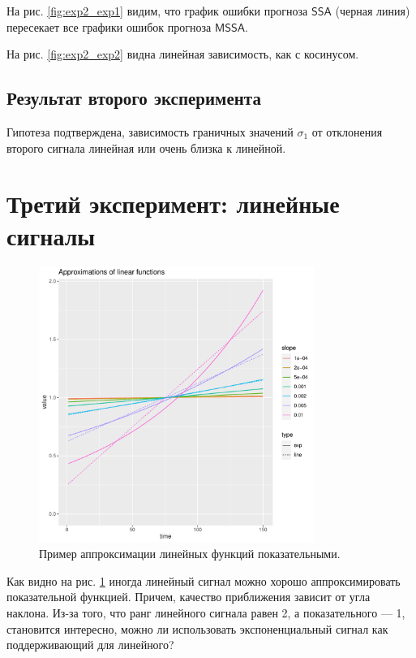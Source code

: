 \documentclass[specialist, substylefile = spbureport.rtx,
    subf,href,colorlinks=true, 12pt]{disser}
\newcommand{\SSA}{\mathsf{SSA}}
\newcommand{\MSSA}{\mathsf{MSSA}}
\begin{document}
        На рис. \ref{fig:exp2_exp1} видим, что график ошибки прогноза $\SSA$ (черная линия) пересекает все графики ошибок прогноза $\MSSA$. 

        На рис. \ref{fig:exp2_exp2} видна линейная зависимость, как с косинусом.
    
    \subsection{Результат второго эксперимента}
        Гипотеза подтверждена, зависимость граничных значений $\sigma_1$ от отклонения второго сигнала линейная или очень близка к линейной.

    \section{Третий эксперимент: линейные сигналы}

        \begin{figure}[h]
            \centering
            \includegraphics[width=0.8\textwidth]{experiment_3_expline.pdf}
            \caption{Пример аппроксимации линейных функций показательными.}
            \label{fig:exp3_expline}
        \end{figure}

        Как видно на рис. \ref{fig:exp3_expline} иногда линейный сигнал можно хорошо аппроксимировать показательной функцией. Причем, качество приближения зависит от угла наклона. Из-за того, что ранг линейного сигнала равен 2, а показательного --- 1, становится интересно, можно ли использовать экспоненциальный сигнал как поддерживающий для линейного?
\end{document}
